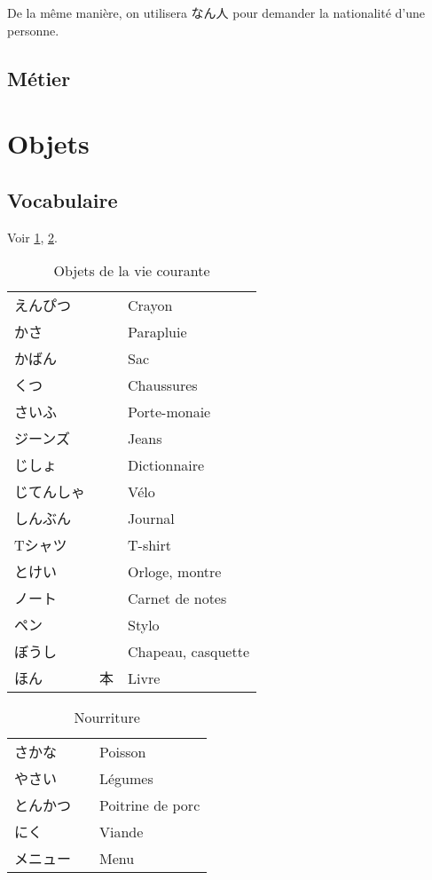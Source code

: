 \documentclass[a4paper,10pt,french,openany]{memoir}
\begin{document}
De la même manière, on utilisera なん人 pour demander la nationalité d'une personne.

\subsection{Métier}

\section{Objets}

\subsection{Vocabulaire}

Voir \cref{tab:objets:vie}, \cref{tab:objets:nourriture}.

\begin{table}[h]
 \centering
 \caption{Objets de la vie courante}
 \label{tab:objets:vie}
 \begin{tabular}{lll}
  えんぴつ &  & Crayon \\
  かさ &  & Parapluie \\
  かばん &  & Sac \\
  くつ &  & Chaussures \\
  さいふ &  & Porte-monaie \\
  ジーンズ &  & Jeans \\
  じしょ &  & Dictionnaire \\
  じてんしゃ &  & Vélo \\
  しんぶん &  & Journal \\
  Tシャツ &  & T-shirt \\
  とけい &  & Orloge, montre \\
  ノート &  & Carnet de notes \\
  ペン &  & Stylo \\
  ぼうし &  & Chapeau, casquette \\
  ほん & 本 & Livre \\
 \end{tabular}
\end{table}

\begin{table}[h]
 \centering
 \caption{Nourriture}
 \label{tab:objets:nourriture}
 \begin{tabular}{lll}
  さかな &  & Poisson　\\
  やさい &  & Légumes \\
  とんかつ &  & Poitrine de porc \\
  にく &  & Viande \\
  メニュー &  & Menu \\
 \end{tabular}
\end{table}
\end{document}
